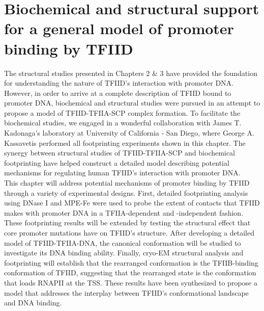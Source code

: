 \chapter{Biochemical and structural support for a general model of promoter binding by TFIID}

The structural studies presented in Chapters 2 \& 3 have provided the foundation for understanding the nature of TFIID's interaction with promoter DNA. However, in order to arrive at a complete description of TFIID bound to promoter DNA, biochemical and structural studies were pursued in an attempt to propose a model of TFIID-TFIIA-SCP complex formation. To facilitate the biochemical studies, we engaged in a wonderful collaboration with James T. Kadonaga's laboratory at University of California - San Diego, where George A. Kassavetis performed all footprinting experiments shown in this chapter. The synergy between structural studies of TFIID-TFIIA-SCP and biochemical footprinting have helped construct a detailed model describing potential mechanisms for regulating human TFIID's interaction with promoter DNA.\\
\indent This chapter will address potential mechanisms of promoter binding by TFIID through a variety of experimental designs. First, detailed footprinting analysis using DNase I and MPE-Fe were used to probe the extent of contacts that TFIID makes with promoter DNA in a TFIIA-dependent and -independent fashion. These footprinting results will be extended by testing the structural effect that core promoter mutations have on TFIID's structure. After developing a detailed model of TFIID-TFIIA-DNA, the canonical conformation will be studied to investigate its DNA binding ability. Finally, cryo-EM structural analysis and footprinting will establish that the rearranged conformation is the TFIIB-binding conformation of TFIID, suggesting that the rearranged state is the conformation that loads RNAPII at the TSS. These results have been synthesized to propose a model that addresses the interplay between TFIID's conformational landscape and DNA binding.\\
  
